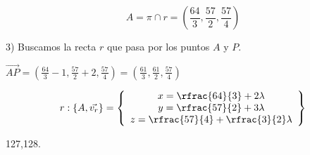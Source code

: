\begin{problem}
\[A = \pi\cap r = \left(\frac{64}{3},\frac{57}{2},\frac{57}{4}\right)\]

3) Buscamos la recta $r$ que pasa por los puntos $A$ y $P$. 

$\vec{AP} = \left(\frac{64}{3}-1,\frac{57}{2}+2,\frac{57}{4}\right) =  \left(\frac{61}{3},\frac{61}{2},\frac{57}{4}\right)$

\[r : \{A,\vec{v_r}\} = \left\{\begin{array}{c}
    x = \rfrac{64}{3} + 2\lambda\\
    y = \rfrac{57}{2} + 3\lambda\\
    z = \rfrac{57}{4} + \rfrac{3}{2}\lambda
\end{array}\right\}\]

\end{problem}

127,128.

